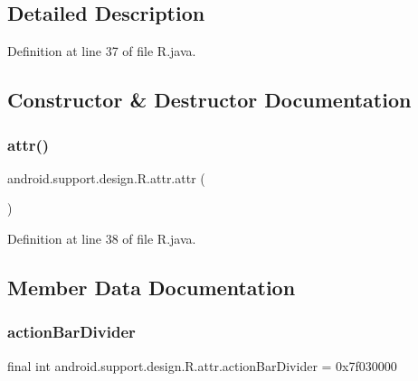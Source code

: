 \subsection{Detailed Description}


Definition at line 37 of file R.\+java.



\subsection{Constructor \& Destructor Documentation}
\mbox{\label{classandroid_1_1support_1_1design_1_1_r_1_1attr_a7f12ec98c2c59686a0c06a82f577c051}} 
\subsubsection{\texorpdfstring{attr()}{attr()}}
{\footnotesize\ttfamily android.\+support.\+design.\+R.\+attr.\+attr (\begin{DoxyParamCaption}{ }\end{DoxyParamCaption})\hspace{0.3cm}{\ttfamily [private]}}



Definition at line 38 of file R.\+java.


\begin{DoxyCode}{0}

\end{DoxyCode}


\subsection{Member Data Documentation}
\mbox{\label{classandroid_1_1support_1_1design_1_1_r_1_1attr_ae760bb3759dc75e0a49d12b13a525863}} 
\subsubsection{\texorpdfstring{actionBarDivider}{actionBarDivider}}
{\footnotesize\ttfamily final int android.\+support.\+design.\+R.\+attr.\+action\+Bar\+Divider = 0x7f030000\hspace{0.3cm}{\ttfamily [static]}}



